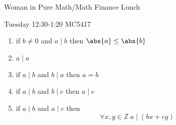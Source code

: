 Woman in Pure Math/Math Finance Lunch

Tuesday 12:30-1:20 MC5417

\begin{thm}
\leavevmode
\begin{enumerate}
    \item if $b\neq 0$ and $a\mid b$ then $\abs{a} \leq \abs{b}$
    \item $a\mid a$
    \item if $a\mid b$ and $b\mid a$ then $a=b$
    \item if $a\mid b$ and $b\mid c$ then $a\mid c$
    \item if $a\mid b$ and $a\mid c$ then \[\forall x,y\in \mathbb{Z} \ a\mid (bx+cy)\]
\end{enumerate}
\end{thm}

